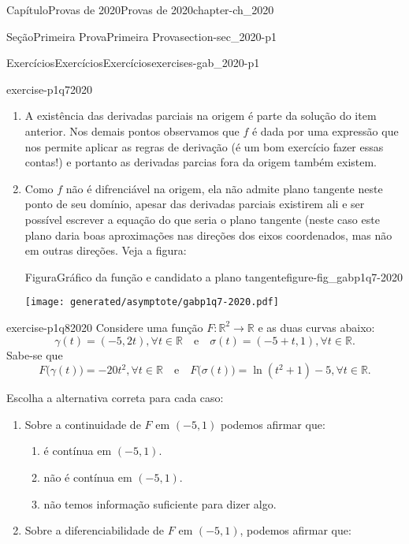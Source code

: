 \documentclass[oneside,10pt,]{book}
\numberwithin{equation}{section}
\newcommand{\R}{\mathbb R}
\begin{document}
\begin{chapterptx}{Capítulo}{Provas de 2020}{}{Provas de 2020}{}{}{chapter-ch_2020}
\begin{sectionptx}{Seção}{Primeira Prova}{}{Primeira Prova}{}{}{section-sec_2020-p1}
\begin{exercises-subsection-numberless}{Exercícios}{Exercícios}{}{Exercícios}{}{}{exercises-gab_2020-p1}
\begin{divisionexercise}{7}{}{}{exercise-p1q72020}
\begin{enumerate}[label=\alph*]
\item{}A existência das derivadas parciais na origem é parte da solução do item anterior. Nos demais pontos observamos que \(f\) é dada por uma expressão que nos permite aplicar as regras de derivação (é um bom exercício fazer essas contas!) e portanto as derivadas parcias fora da origem também existem.%
\item{}Como \(f\) não é difrenciável na origem, ela não admite plano tangente neste ponto de seu domínio, apesar das derivadas parciais existirem ali e ser possível escrever a equação do que seria o plano tangente (neste caso este plano daria boas aproximações nas direções dos eixos coordenados, mas não em outras direções. Veja a figura: \begin{figureptx}{Figura}{Gráfico da função e candidato a plano tangente}{figure-fig_gabp1q7-2020}{}%
\begin{image}{0.25}{0.5}{0.25}{}%
\texttt{[image: generated/asymptote/gabp1q7-2020.pdf]}
\end{image}%
\tcblower
\end{figureptx}%
%
\end{enumerate}
\end{divisionexercise}%
\begin{divisionexercise}{8}{}{}{exercise-p1q82020}%
Considere uma função \(F\colon\R^2\to\R\) e as duas curvas abaixo:%
\begin{equation*}
\gamma (t) = (-5,2t ), \forall t \in \mathbb
{R}\quad \mbox {e}\quad \sigma (t) = (-5 +t,1), \forall t \in
\mathbb {R}.
\end{equation*}
Sabe-se que%
\begin{equation*}
F\big(\gamma (t)\big )= -20t^2, \forall t \in
\mathbb {R}\quad \mbox {e}\quad F\big (\sigma (t)\big )=\ln
(t^2+1)-5, \forall t \in \mathbb {R}.
\end{equation*}
%
\par
Escolha a alternativa correta para cada caso:%
\begin{enumerate}[label=\roman*]
\item{}Sobre a continuidade de \(F\) em \((-5,1)\) podemos afirmar que:%
\begin{enumerate}[label=\alph*]
\item{}é contínua em \((-5,1)\).%
\item{}não é contínua em \((-5,1)\).%
\item{}não temos informação suficiente para dizer algo.%
\end{enumerate}
%
\item{}Sobre a diferenciabilidade de \(F\) em \((-5,1)\), podemos afirmar que:%

\end{enumerate}
\end{divisionexercise}
\end{exercises-subsection-numberless}
\end{sectionptx}
\end{chapterptx}
\end{document}
